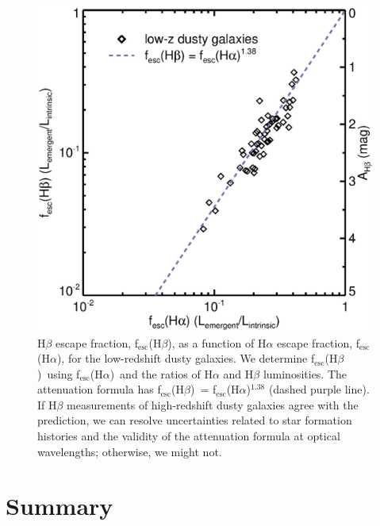 \documentclass[referee]{aa}
\newcommand{\alephha}{f$_{\mathrm{esc}}$(H$\alpha$)}
\newcommand{\alephhb}{f$_{\mathrm{esc}}$(H$\beta$)}
\begin{document}
\begin{figure}[!ht]
\centering
\includegraphics[scale=0.5]{ahb_aha_lowzdog.eps}
\caption{H$\beta$ escape fraction, \alephhb, as a function of H$\alpha$ escape
fraction, \alephha, for the low-redshift dusty galaxies.  We determine
\alephhb~using \alephha~and the ratios of H$\alpha$ and H$\beta$ luminosities.
The \citet{calzetti00} attenuation formula has \alephhb~= \alephha$^{1.38}$
(dashed purple line).  If H$\beta$ measurements of high-redshift dusty galaxies
agree with the prediction, we can resolve uncertainties related to star
formation histories and the validity of the \citet{calzetti00} attenuation
formula at optical
wavelengths; otherwise, we might not.\label{ahb}}
\end{figure}

\section{Summary}\label{sec:conclude}
\end{document}
